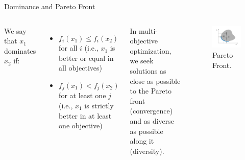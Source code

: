 \documentclass[aspectratio=169,xcolor=dvipsnames]{beamer}
\begin{document}
\begin{frame}{Dominance and Pareto Front}
    \begin{columns}[c]
        We say that $x_1$ dominates $x_2$ if:
        \begin{itemize}
            \item $f_i(x_1) \leq f_i(x_2)$ for all $i$ (i.e., $x_1$ is better or equal in all objectives)
            \item $f_j(x_1) < f_j(x_2)$ for at least one $j$ (i.e., $x_1$ is strictly better in at least one objective)
        \end{itemize}
        \vspace{1em}
        In multi-objective optimization, we seek solutions as close as possible to the Pareto front (\alert{convergence}) and as diverse as possible along it (\alert{diversity}).

        \begin{figure}
            \centering
            \includegraphics[width=1.0\linewidth]{imgs/pareto-front.pdf}
            \caption{Pareto Front.}
        \end{figure}
    \end{columns}
\end{frame}
\end{document}
